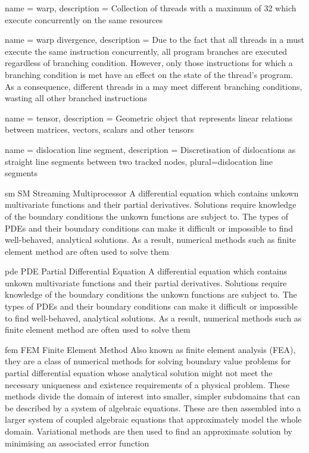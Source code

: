 {
	name = {warp},
	description = {Collection of threads with a maximum of 32 which execute concurrently on the same  resources}
}

{
	name = {warp divergence},
	description = {Due to the fact that all threads in a  must execute the same instruction concurrently, all program branches are executed regardless of branching condition. However, only those instructions for which a branching condition is met have an effect on the state of the thread's program. As a consequence, different threads in a  may meet different branching conditions, wasting all other branched instructions}
}

{
	name = {tensor},
	description = {Geometric object that represents linear relations between matrices, vectors, scalars and other tensors}
}

{
	name = {dislocation line segment},
	description = {Discretisation of dislocations as straight line segments between two tracked nodes},
	plural={dislocation line segments}
}

\newdualentry
{sm}
{SM}
{Streaming Multiprocessor}
{A differential equation which contains unkown multivariate functions and their partial derivatives. Solutions require knowledge of the boundary conditions the unkown functions are subject to. The types of PDEs and their boundary conditions can make it difficult or impossible to find well-behaved, analytical solutions. As a result, numerical methods such as finite element method are often used to solve them}

\newdualentry
{pde}
{PDE}
{Partial Differential Equation}
{A differential equation which contains unkown multivariate functions and their partial derivatives. Solutions require knowledge of the boundary conditions the unkown functions are subject to. The types of PDEs and their boundary conditions can make it difficult or impossible to find well-behaved, analytical solutions. As a result, numerical methods such as finite element method are often used to solve them}

\newdualentry
{fem}
{FEM}
{Finite Element Method}
{Also known as finite element analysis (FEA), they are a class of numerical methods for solving boundary value problems for partial differential equation whose analytical solution might not meet the necessary uniqueness and existence requirements of a physical problem. These methods divide the domain of interest into smaller, simpler subdomains that can be described by a system of algebraic equations. These are then assembled into a larger system of coupled algebraic equations that approximately model the whole domain. Variational methods are then used to find an approximate solution by minimising an associated error function}

